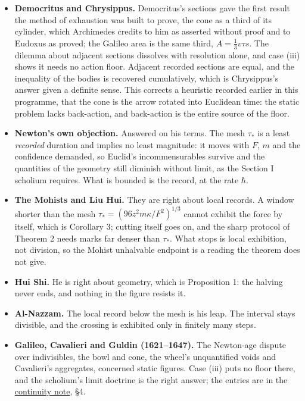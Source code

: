 \documentclass[11pt,a4paper]{article}
\begin{document}
\begin{itemize}
  this entry sets a limit on how far the reconstruction reaches.
\item
  \textbf{Democritus and Chrysippus.} Democritus's sections gave the
  first result the method of exhaustion was built to prove, the cone as
  a third of its cylinder, which Archimedes credits to him as asserted
  without proof and to Eudoxus as proved; the Galileo area is the same
  third, \(A=\frac13v\tau s\). The dilemma about adjacent sections
  dissolves with resolution alone, and case (iii) shows it needs no
  action floor. Adjacent recorded sections are equal, and the inequality
  of the bodies is recovered cumulatively, which is Chrysippus's answer
  given a definite sense. This corrects a heuristic recorded earlier in
  this programme, that the cone is the arrow rotated into Euclidean
  time: the static problem lacks back-action, and back-action is the
  entire source of the floor.
\item
  \textbf{Newton's own objection.} Answered on his terms. The mesh
  \(\tau_*\) is a least \emph{recorded} duration and implies no least
  magnitude: it moves with \(F\), \(m\) and the confidence demanded, so
  Euclid's incommensurables survive and the quantities of the geometry
  still diminish without limit, as the Section I scholium requires. What
  is bounded is the record, at the rate \(\hbar\).
\item
  \textbf{The Mohists and Liu Hui.} They are right about local records.
  A window shorter than the mesh \(\tau_*=(96z^2m\kappa/F^2)^{1/3}\)
  cannot exhibit the force by itself, which is Corollary 3; cutting
  itself goes on, and the sharp protocol of Theorem 2 needs marks far
  denser than \(\tau_*\). What stops is local exhibition, not division,
  so the Mohist unhalvable endpoint is a reading the theorem does not
  give.
\item
  \textbf{Hui Shi.} He is right about geometry, which is Proposition 1:
  the halving never ends, and nothing in the figure resists it.
\item
  \textbf{Al-Nazzam.} The local record below the mesh is his leap. The
  interval stays divisible, and the crossing is exhibited only in
  finitely many steps.
\item
  \textbf{Galileo, Cavalieri and Guldin (1621--1647).} The Newton-age
  dispute over indivisibles, the bowl and cone, the wheel's unquantified
  voids and Cavalieri's aggregates, concerned static figures. Case (iii)
  puts no floor there, and the scholium's limit doctrine is the right
  answer; the entries are in the
  \href{leibniz-continuity-records.md}{continuity note}, §4.

\end{itemize}
\end{document}
